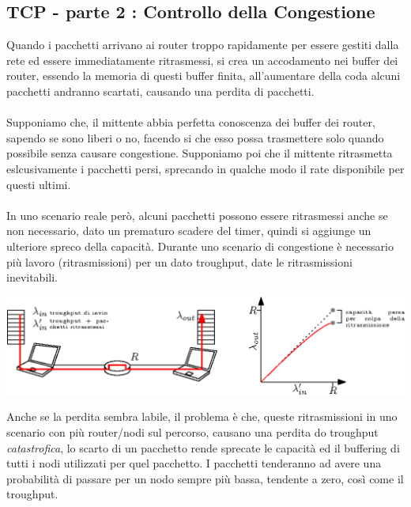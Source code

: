 \documentclass[12pt, letterpaper]{article}
\newcommand{\acc}{\\\hphantom{}\\}
\begin{document}
\subsection{TCP - parte 2 : Controllo della Congestione }
Quando i pacchetti arrivano ai router troppo rapidamente per essere gestiti dalla rete ed essere immediatamente
ritrasmessi, si crea un accodamento nei buffer dei router, essendo la memoria di questi buffer finita, all'aumentare
della coda alcuni pacchetti andranno scartati, causando una perdita di pacchetti.\acc
Supponiamo che, il mittente abbia perfetta conoscenza dei buffer dei router, sapendo se sono liberi o no,
facendo si che esso possa trasmettere solo quando possibile senza causare congestione. Supponiamo poi che il mittente
ritrasmetta eslcusivamente i pacchetti persi, sprecando in qualche modo il rate disponibile per questi ultimi.\acc
In uno scenario reale però, alcuni pacchetti possono essere ritrasmessi anche se non necessario, dato un prematuro scadere
del timer, quindi si aggiunge un ulteriore spreco della capacità. Durante uno scenario di congestione è necessario più
lavoro (ritrasmissioni) per un dato troughput, date le ritrasmissioni inevitabili.\begin{center}
    \includegraphics[width=\textwidth ]{images/perditaCongestione.eps}
\end{center}
Anche se la perdita sembra labile, il problema è che, queste ritrasmissioni in uno scenario con più
router/nodi sul percorso, causano una perdita do troughput \textit{catastrofica}, lo scarto di un pacchetto rende
sprecate le capacità ed il buffering di tutti i nodi utilizzati per quel pacchetto. I pacchetti tenderanno
ad avere una probabilità di passare per un nodo sempre più bassa, tendente a zero, così come il troughput.
\end{document}
